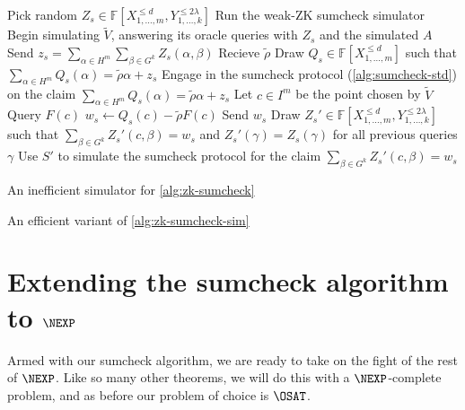 \documentclass[english,12pt]{reedthesis}
\theoremstyle{plain}
\theoremstyle{definition}
\theoremstyle{remark}
\begin{document}
\begin{algorithm}[htbp]
  Pick random $Z_{s} \in \mathbb{F}[X_{1, \ldots, m}^{\le d}, Y_{1, \ldots, k}^{\le 2\lambda}]$\;
  Run the weak-ZK sumcheck simulator\; %
  Begin simulating $\tilde{V}$, answering its oracle queries with $Z_{s}$ and
  the simulated $A$\;
  Send $z_{s} = \sum_{\alpha \in H^{m}}\sum_{\beta \in G^{k}}Z_{s}(\alpha, \beta)$\;
  Recieve $\tilde{\rho}$\; %
  Draw $Q_{s} \in \mathbb{F}[X_{1, \ldots, m}^{\le d}]$ such that
  $\sum_{\alpha \in H^{m}}Q_{s}(\alpha) = \tilde{\rho}\alpha + z_{s}$\;
  Engage in the sumcheck protocol (\cref{alg:sumcheck-std}) on the claim
  $\sum_{\alpha \in H^{m}}Q_{s}(\alpha) = \tilde{\rho}\alpha + z_{s}$\;
  Let $c \in I^{m}$ be the point chosen by $\tilde{V}$\;
  Query $F(c)$\;
  $w_{s} \leftarrow Q_{s}(c) - \tilde{\rho}F(c)$\;
  Send $w_{s}$\;
  Draw $Z_{s}' \in \mathbb{F}[X_{1, \ldots, m}^{\le d}, Y_{1, \ldots, k}^{\le 2\lambda}]$ such that
  $\sum_{\beta \in G^{k}}Z_{s}'(c, \beta) = w_{s}$ and $Z_{s}'(\gamma) = Z_{s}(\gamma)$ for all
  previous queries $\gamma$\;
  Use $S'$ to simulate the sumcheck protocol for the claim
  $\sum_{\beta \in G^{k}}Z_{s}'(c, \beta) = w_{s}$\;
  \;
  \caption{An inefficient simulator for
    \cref{alg:zk-sumcheck}~\cite[p.\ 15:33]{CFGS22}}\label{alg:zk-sumcheck-sim}
\end{algorithm}

\begin{algorithm}[htbp]
  \caption{An efficient variant of
    \cref{alg:zk-sumcheck-sim}~\cite[p.\ 15:34]{CFGS22}}\label{alg:zk-sumcheck-fast}
\end{algorithm}


\section{Extending the sumcheck algorithm to $\NEXP$}



Armed with our sumcheck algorithm, we are ready to take on the fight of the rest
of $\NEXP$. Like so many other theorems, we will do this with a $\NEXP$-complete
problem, and as before our problem of choice is $\OSAT$.
\end{document}
